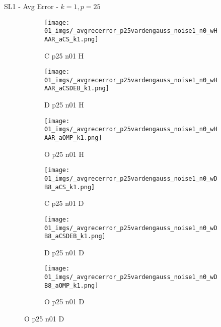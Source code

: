 \begin{frame}{SL1 - Avg Error - $k=1,p=25$}{}
\begin{figure}
\begin{subfigure}{0.13\textwidth}
\texttt{[image: 01\_imgs/\_avgrecerror\_p25vardengauss\_noise1\_n0\_wHAAR\_aCS\_k1.png]}
\caption*{\tiny C p25 n01 H}
\end{subfigure}
\begin{subfigure}{0.13\textwidth}
\texttt{[image: 01\_imgs/\_avgrecerror\_p25vardengauss\_noise1\_n0\_wHAAR\_aCSDEB\_k1.png]}
\caption*{\tiny D p25 n01 H}
\end{subfigure}
\begin{subfigure}{0.13\textwidth}
\texttt{[image: 01\_imgs/\_avgrecerror\_p25vardengauss\_noise1\_n0\_wHAAR\_aOMP\_k1.png]}
\caption*{\tiny O p25 n01 H}
\end{subfigure}
\begin{subfigure}{0.13\textwidth}
\texttt{[image: 01\_imgs/\_avgrecerror\_p25vardengauss\_noise1\_n0\_wDB8\_aCS\_k1.png]}
\caption*{\tiny C p25 n01 D}
\end{subfigure}
\begin{subfigure}{0.13\textwidth}
\texttt{[image: 01\_imgs/\_avgrecerror\_p25vardengauss\_noise1\_n0\_wDB8\_aCSDEB\_k1.png]}
\caption*{\tiny D p25 n01 D}
\end{subfigure}
\begin{subfigure}{0.13\textwidth}
\texttt{[image: 01\_imgs/\_avgrecerror\_p25vardengauss\_noise1\_n0\_wDB8\_aOMP\_k1.png]}
\caption*{\tiny O p25 n01 D}
\end{subfigure}

\vspace{5pt}


\end{figure}
\end{frame}
